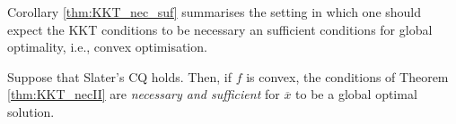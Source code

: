 Corollary \ref{thm:KKT_nec_suf} summarises the setting in which one should expect the KKT conditions to be necessary an sufficient conditions for global optimality, i.e., convex optimisation.

\begin{corollary} \label{thm:KKT_nec_suf}
Suppose that Slater's CQ holds. Then, if $f$ is convex, the conditions of Theorem \ref{thm:KKT_necII} are \emph{necessary and sufficient} for $\overline{x}$ to be a global optimal solution. 
\end{corollary}
